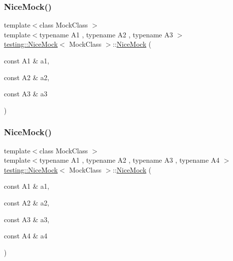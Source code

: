 \subsubsection{\texorpdfstring{Nice\+Mock()}{NiceMock()}\hspace{0.1cm}{\footnotesize\ttfamily [4/11]}}
{\footnotesize\ttfamily template$<$class Mock\+Class $>$ \\
template$<$typename A1 , typename A2 , typename A3 $>$ \\
\hyperlink{classtesting_1_1_nice_mock}{testing\+::\+Nice\+Mock}$<$ Mock\+Class $>$\+::\hyperlink{classtesting_1_1_nice_mock}{Nice\+Mock} (\begin{DoxyParamCaption}\item[{const A1 \&}]{a1,  }\item[{const A2 \&}]{a2,  }\item[{const A3 \&}]{a3 }\end{DoxyParamCaption})\hspace{0.3cm}{\ttfamily [inline]}}

\mbox{\label{classtesting_1_1_nice_mock_a5ffbe1a648f16612266d4e67a2d063d1}} 
\subsubsection{\texorpdfstring{Nice\+Mock()}{NiceMock()}\hspace{0.1cm}{\footnotesize\ttfamily [5/11]}}
{\footnotesize\ttfamily template$<$class Mock\+Class $>$ \\
template$<$typename A1 , typename A2 , typename A3 , typename A4 $>$ \\
\hyperlink{classtesting_1_1_nice_mock}{testing\+::\+Nice\+Mock}$<$ Mock\+Class $>$\+::\hyperlink{classtesting_1_1_nice_mock}{Nice\+Mock} (\begin{DoxyParamCaption}\item[{const A1 \&}]{a1,  }\item[{const A2 \&}]{a2,  }\item[{const A3 \&}]{a3,  }\item[{const A4 \&}]{a4 }\end{DoxyParamCaption})\hspace{0.3cm}{\ttfamily [inline]}}

\mbox{\label{classtesting_1_1_nice_mock_a3812c0ba0d743f9a0c3d276dfc076f4c}} 
